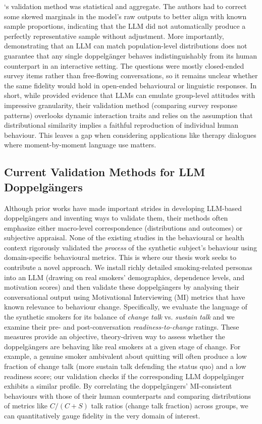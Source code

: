 \citet{argyle2023}`s validation method was statistical and aggregate. The authors had to correct some skewed marginals in the model's raw outputs to better align with known sample proportions, indicating that the LLM did not automatically produce a perfectly representative sample without adjustment. More importantly, demonstrating that an LLM can match population-level distributions does not guarantee that any single doppelgänger behaves indistinguishably from its human counterpart in an interactive setting. The questions were mostly closed-ended survey items rather than free-flowing conversations, so it remains unclear whether the same fidelity would hold in open-ended behavioural or linguistic responses. In short, while \citet{argyle2023} provided evidence that LLMs can emulate group-level attitudes with impressive granularity, their validation method (comparing survey response patterns) overlooks dynamic interaction traits and relies on the assumption that distributional similarity implies a faithful reproduction of individual human behaviour. This leaves a gap when considering applications like therapy dialogues where moment-by-moment language use matters.



\subsection{Current Validation Methods for LLM Doppelgängers}


Although prior works have made important strides in developing LLM-based doppelgängers and inventing ways to validate them, their methods often emphasize either macro-level correspondence (distributions and outcomes) or subjective appraisal. None of the existing studies in the behavioural or health context rigorously validated the \emph{process} of the synthetic subject's behaviour using domain-specific behavioural metrics. This is where our thesis work seeks to contribute a novel approach. We install richly detailed smoking-related personas into an LLM (drawing on real smokers' demographics, dependence levels, and motivation scores) and then validate these doppelgängers by analysing their conversational output using Motivational Interviewing (MI) metrics that have known relevance to behaviour change. Specifically, we evaluate the language of the synthetic smokers for its balance of \emph{change talk} vs. \emph{sustain talk} and we examine their pre- and post-conversation \emph{readiness-to-change} ratings. These measures provide an objective, theory-driven way to assess whether the doppelgängers are behaving like real smokers at a given stage of change. For example, a genuine smoker ambivalent about quitting will often produce a low fraction of change talk (more sustain talk defending the status quo) and a low readiness score; our validation checks if the corresponding LLM doppelgänger exhibits a similar profile. By correlating the doppelgängers' MI-consistent behaviours with those of their human counterparts and comparing distributions of metrics like $C/(C+S)$ talk ratios (change talk fraction) across groups, we can quantitatively gauge fidelity in the very domain of interest. 

